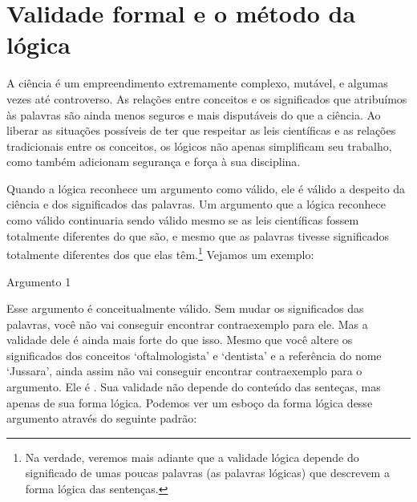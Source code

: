 \section{Validade formal e o método da lógica}
A ciência é um empreendimento extremamente complexo, mutável, e algumas vezes até controverso. As relações entre conceitos e os significados que atribuímos às palavras são ainda menos seguros e mais disputáveis do que a ciência.
Ao liberar as situações possíveis de ter que respeitar as leis científicas e as relações tradicionais entre os conceitos, os lógicos não apenas simplificam seu trabalho, como também adicionam segurança e força à sua disciplina.

Quando a lógica reconhece um argumento como válido, ele é válido a despeito da ciência e dos significados das palavras.
Um argumento que a lógica reconhece como válido continuaria sendo válido mesmo se as leis científicas fossem totalmente diferentes do que são, e mesmo que as palavras tivesse significados totalmente diferentes dos que elas têm.\footnote{
	Na verdade, veremos mais adiante que a validade lógica depende do significado de umas poucas palavras (as palavras lógicas) que descrevem a forma lógica das sentenças.}
Vejamos um exemplo:
\begin{description}
\item[Argumento 1]
\end{description}
Esse argumento é conceitualmente válido.
Sem mudar os significados das palavras, você não vai conseguir encontrar contraexemplo para ele.
Mas a validade dele é ainda mais forte do que isso.
Mesmo que você altere os significados dos conceitos `oftalmologista' e `dentista' e a referência do nome `Jussara', ainda assim não vai conseguir encontrar contraexemplo para o argumento.
Ele é .
Sua validade não depende do conteúdo das senteças, mas apenas de sua forma lógica.
Podemos ver um esboço da forma lógica desse argumento através do seguinte padrão:



